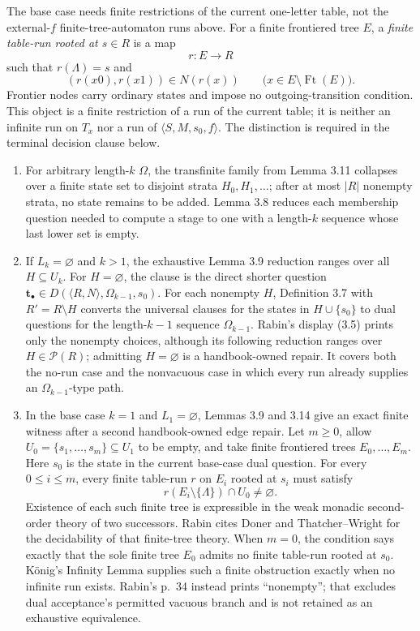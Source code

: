 The base case needs finite restrictions of the current one-letter table, not
the external-\(f\) finite-tree-automaton runs above.  For a finite frontiered
tree \(E\), a \emph{finite table-run rooted at \(s\in R\)} is a map
\[
 r:E\longrightarrow R
\]
such that \(r(\Lambda)=s\) and
\[
 (r(x0),r(x1))\in N(r(x))
 \qquad\bigl(x\in E\setminus\operatorname{Ft}(E)\bigr).
\]
Frontier nodes carry ordinary states and impose no outgoing-transition
condition.  This object is a finite restriction of a run of the current table;
it is neither an infinite run on \(T_x\) nor a run of
\(\langle S,M,s_0,f\rangle\).  The distinction is required in the terminal
decision clause below.

\begin{enumerate}
\item For arbitrary length-\(k\) \(\Omega\), the transfinite family from Lemma
  3.11 collapses over a finite state set to disjoint strata
  \(H_0,H_1,\ldots\); after at most \(|R|\) nonempty strata, no state remains
  to be added.  Lemma 3.8 reduces
  each membership question needed to compute a stage to one with a
  length-\(k\) sequence whose last lower set is empty.

\item If \(L_k=\varnothing\) and \(k>1\), the exhaustive Lemma 3.9 reduction
  ranges over all \(H\subseteq U_k\).  For \(H=\varnothing\), the clause is
  the direct shorter question
  \(\mathbf t_\bullet\in
    D(\langle R,N\rangle,\Omega_{k-1},s_0)\).  For each nonempty
  \(H\), Definition 3.7 with \(R'=R\setminus H\) converts the universal
  clauses for the states in \(H\cup\{s_0\}\) to dual questions for the
  length-\(k-1\) sequence \(\Omega_{k-1}\).  Rabin's display (3.5) prints
  only the nonempty choices, although its following reduction ranges over
  \(H\in\mathcal P(R)\); admitting \(H=\varnothing\) is a handbook-owned
  repair.  It covers both the no-run case and the nonvacuous case in which
  every run already supplies an \(\Omega_{k-1}\)-type path.

\item In the base case \(k=1\) and \(L_1=\varnothing\), Lemmas 3.9 and 3.14
  give an exact finite witness after a second handbook-owned edge repair.  Let
  \(m\geq0\), allow
  \(U_0=\{s_1,\ldots,s_m\}\subseteq U_1\) to be empty, and take finite
  frontiered trees
  \(E_0,\ldots,E_m\).  Here \(s_0\) is the state in the current base-case
  dual question.  For every \(0\leq i\leq m\), every finite table-run \(r\) on
  \(E_i\) rooted at \(s_i\) must satisfy
  \[
   r(E_i\setminus\{\Lambda\})\cap U_0\neq\varnothing.
  \]
  Existence
  of each
  such finite tree is expressible in the weak monadic second-order theory of
  two successors.  Rabin cites Doner and Thatcher--Wright for the decidability
  of that finite-tree theory.  When \(m=0\), the condition says exactly that
  the sole finite tree \(E_0\) admits no finite table-run rooted at \(s_0\).
  K\"onig's Infinity
  Lemma supplies such a finite obstruction exactly when no infinite run exists.
  Rabin's p.~34 instead prints \enquote{nonempty}; that excludes dual
  acceptance's permitted vacuous branch and is not retained as an exhaustive
  equivalence.
\end{enumerate}

